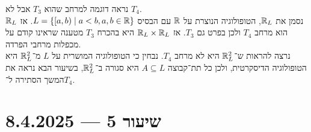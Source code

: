 \begin{example}
	נראה דוגמה למרחב שהוא $T_3$ אבל לא $T_4$. \\
	נסמן את $\mathbb{R}_L$, הטופולוגיה הנוצרת על $\mathbb{R}$ עם הבסיס $L = \{ [a, b) \mid a < b, a, b \in \mathbb{R} \}$.
	אז $\mathbb{R}_L$ הוא מרחב $T_4$ ולכן בפרט גם $T_3$.
	אז $\mathbb{R}_L \times \mathbb{R}_L$ היא בהכרח $T_3$ מטענה שראינו קודם על מכפלות מרחבי הפרדה. \\
	נרצה להראות ש־$\mathbb{R}_L^2$ היא לא מרחב $T_4$.
	נבחין כי הטופולוגיה המושרית על $L$ מ־$\mathbb{R}_L^2$ היא הטופולוגיה הדיסקרטית, ולכן כל תת־קבוצה $A \subseteq L$ היא סגורה ב־$\mathbb{R}_L^2$, בשיעור הבא נראה את המשך הסתירה ל־$T_4$.
\end{example}

\section{שיעור 5 --- 8.4.2025}
